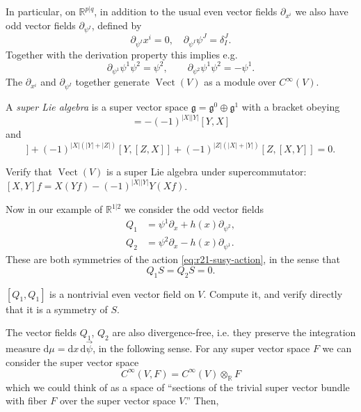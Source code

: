 \documentclass[12pt,letterpaper,reqno]{article}
\numberwithin{equation}{section}
\newcommand{\fg}{{\mathfrak g}}
\newcommand{\R}{\ensuremath{\mathbb R}}
\newcommand{\de}{\mathrm{d}}
\newcommand{\abs}[1]{\lvert#1\rvert}
\newcommand{\ti}[1]{\textit{#1}}
\DeclareMathOperator{\Vect}{Vect}
\begin{document}
In particular, on $\R^{p \vert q}$, in addition
to the usual even vector fields $\partial_{x^i}$ we also have
odd vector fields $\partial_{\psi^I}$, defined by
\begin{equation}
  \partial_{\psi^I} x^i = 0, \quad \partial_{\psi^I} \psi^J = \delta^J_I.
\end{equation}
Together with the derivation property this implies
e.g.
\begin{equation}
  \partial_{\psi^1} \psi^1 \psi^2 = \psi^2, \qquad \partial_{\psi^2} \psi^1 \psi^2 = - \psi^1.
\end{equation}
The $\partial_{x^i}$ and $\partial_{\psi^I}$ together
generate $\Vect(V)$ as a module over $C^\infty(V)$.

\begin{defn} A \ti{super Lie algebra} is a super
vector space $\fg = \fg^0 \oplus \fg^1$ with a bracket obeying
\begin{equation}
  [X,Y] = -(-1)^{\abs{X} \abs{Y}} [Y,X]
\end{equation}
and
\begin{equation}
[X,[Y,Z]] + (-1)^{\abs{X}(\abs{Y}+\abs{Z})} [Y,[Z,X]] + (-1)^{\abs{Z}(\abs{X}+\abs{Y})}[Z,[X,Y]] = 0.
\end{equation}
\end{defn}

\begin{exercise} Verify that $\Vect(V)$ is 
a super Lie algebra under supercommutator: $[X,Y] f = X(Yf) - (-1)^{\abs{X} \abs{Y}} Y(Xf)$.
\end{exercise}

Now in our example of $\R^{1 \vert 2}$ we consider the
odd vector fields
\begin{align}
  Q_1 &= \psi^1 \partial_x + h(x) \partial_{\psi^2}, \\
  Q_2 &= \psi^2 \partial_x - h(x) \partial_{\psi^1}.
\end{align}
These are both symmetries of the action \eqref{eq:r21-susy-action}, 
in the sense that
\begin{equation}
  Q_1 S = Q_2 S = 0.
\end{equation}

\begin{exercise}
$[Q_1,Q_1]$ is a nontrivial even
vector field on $V$. Compute it, and verify directly 
that it is a symmetry of $S$.
\end{exercise}

The vector fields $Q_1$, $Q_2$ are also divergence-free, i.e. they preserve the
integration measure $\de \mu = \de x \, \de \vec\psi$,
in the following sense.
For any super vector space $F$ we can consider the super vector space
\begin{equation}
  C^\infty(V, F) = C^\infty(V) \otimes_\R F
\end{equation}
which we could think of as a space of ``sections of the trivial super
vector bundle with fiber $F$ over the super vector space $V$.''
Then,
\end{document}
